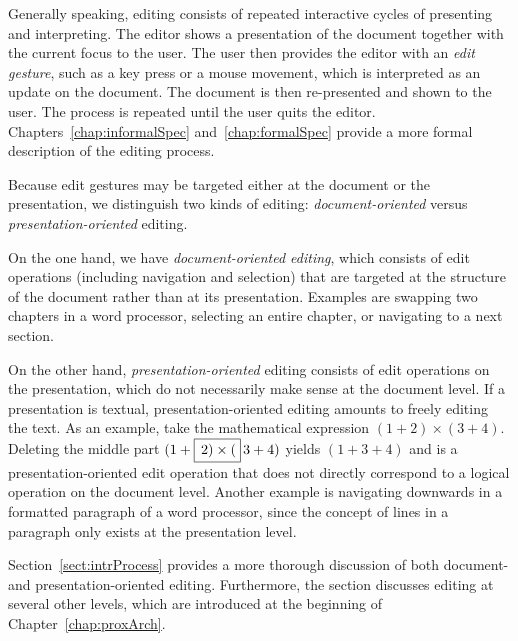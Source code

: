 Generally speaking, editing consists of repeated interactive cycles of presenting and interpreting. The editor shows a presentation of the document together with the current focus to the user. The user then provides the editor with an {\em edit gesture}, such as a key press or a mouse movement, which is interpreted as an update on the document. The document is then re-presented and shown to the user. The process is repeated until the user quits the editor. Chapters~\ref{chap:informalSpec} and~\ref{chap:formalSpec} provide a more formal description of the editing process.


Because edit gestures may be targeted either at the document or the presentation, we distinguish two kinds of editing:  {\em document-oriented} versus {\em presentation-oriented} editing.


On the one hand, we have {\em document-oriented editing}, which consists of edit operations (including navigation and selection) that are targeted at the structure of the document rather than at its presentation. Examples are swapping two chapters in a word processor, selecting an entire chapter, or navigating to a next section.

On the other hand, {\em presentation-oriented} editing consists of edit operations on the presentation, which do not necessarily make sense at the document level. If a presentation is textual,  presentation-oriented editing amounts to freely editing the text. As an example, take the mathematical expression  
$(1+2) \times (3+4)$. Deleting the middle part $(1+\framebox{$\,2) \times ($}\,3+4)$ yields $(1+3+4)$ and is a presentation-oriented edit operation that does not directly correspond to a logical operation on the document level. Another example is navigating downwards in a formatted paragraph of a word processor, since the concept of lines in a paragraph only exists at the presentation level. 

Section~\ref{sect:intrProcess} provides a more thorough discussion of both document- and presentation-oriented  editing. Furthermore, the section discusses editing at several other levels, which are introduced at the beginning of Chapter~\ref{chap:proxArch}.


